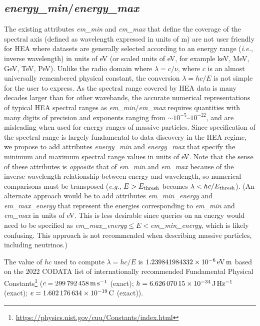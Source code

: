 \documentclass[11pt,a4paper]{ivoa}
\begin{document}
\subsection{{\em energy\_min\/}/{\em energy\_max\/}}

The existing attributes {\em em\_min\/} and {\em em\_max\/} that define the coverage of the spectral axis (defined as wavelength expressed in units of m) are not user friendly for \gls{HEA} where datasets are generally selected according to an energy range ({\em i.e.\/}, inverse wavelength) in units of eV (or scaled units of eV, for example keV, MeV, GeV, TeV, PeV). Unlike the radio domain where $\lambda = c/\nu$, where $c$ is an almost universally remembered physical constant, the conversion $\lambda = hc/E$ is not simple for the user to express. As the spectral range covered by \gls{HEA} data is many decades larger than for other wavebands, the accurate numerical representations of typical \gls{HEA} spectral ranges as {\em em\_min\/}/{\em em\_max\/} requires quantities with many digits of precision and exponents ranging from $\sim\!10^{-5}$--$10^{-22}$, and are misleading when used for energy ranges of massive particles.  Since specification of the spectral range is largely fundamental to data discovery in the \gls{HEA} regime, we propose to add attributes {\em energy\_min\/} and {\em energy\_max\/} that specify the minimum and maximum spectral range values in units of eV\null. Note that the sense of these attributes is {\em opposite\/} that of {\em em\_min\/} and {\em em\_max\/} because of the inverse wavelength relationship between energy and wavelength, so numerical comparisons must be transposed ({\em e.g.\/}, $E>E_{\rm thresh}$ becomes $\lambda<hc/E_{\rm thresh}$).  (An alternate approach would be to add attributes {\em em\_min\_energy\/} and {\em em\_max\_energy\/} that represent the energies corresponding to {\em em\_min\/} and {\em em\_max\/} in units of eV\null. This is less desirable since queries on an energy would need to be specified as {\em em\_max\_energy\/}${}\leq E <{}${\em em\_min\_energy\/}, which is likely confusing. This approach is not recommended when describing massive particles, including neutrinos.)

The value of $hc$ used to compute $\lambda = hc/E$ is $1.239841984332\times10^{-6}\rm \,eV\,m$ based on the 2022 CODATA list of internationally recommended Fundamental Physical Constants\footnote{\url{https://physics.nist.gov/cuu/Constants/index.html}} ($c = 299\,792\,458\rm \,m\,s^{-1}$ (exact); $h = 6.626\,070\,15\times10^{-34}\rm \,J\,Hz^{-1}$ (exact); $e = 1.602\,176\,634\times10^{-19}\rm \,C$ (exact)).
\end{document}
